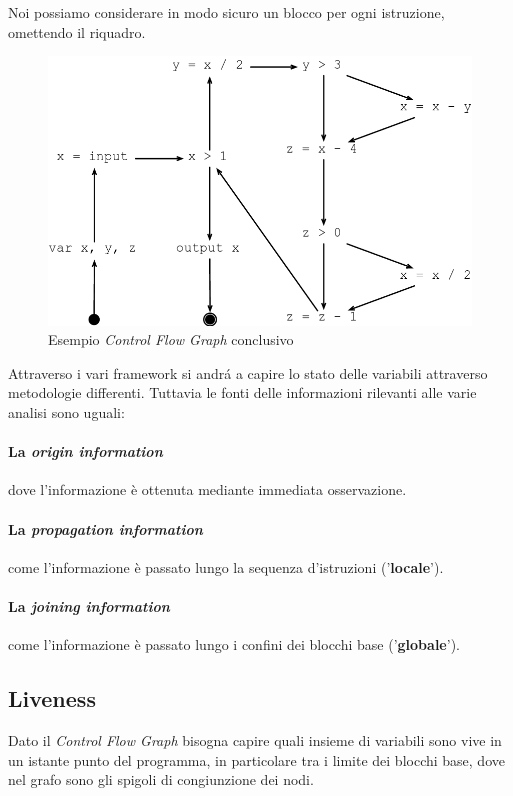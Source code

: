 Noi possiamo considerare in modo sicuro un blocco per ogni istruzione,
omettendo il riquadro.

\begin{figure}[H]
  \centering
  \includegraphics[scale=0.4]{res/image/cfg_no_block}
  \caption{Esempio \textit{Control Flow Graph} conclusivo}
  \label{img:cfg_no_block}
\end{figure}

Attraverso i vari framework si andr\'a a capire lo stato delle variabili
attraverso metodologie differenti. Tuttavia le fonti delle informazioni
rilevanti alle varie analisi sono uguali:

\paragraph{La \textit{origin information}}
dove l'informazione \`e ottenuta mediante immediata osservazione.
\paragraph{La \textit{propagation information}}
come l'informazione \`e passato lungo la sequenza d'istruzioni
('\textbf{locale}').
\paragraph{La \textit{joining information}}
come l'informazione \`e passato lungo i confini dei blocchi base
('\textbf{globale}').

\subsection{Liveness}
Dato il \textit{Control Flow Graph} bisogna capire quali insieme di variabili
sono vive in un istante punto del programma, in particolare tra i limite dei
blocchi base, dove nel grafo sono gli spigoli di congiunzione dei nodi.

